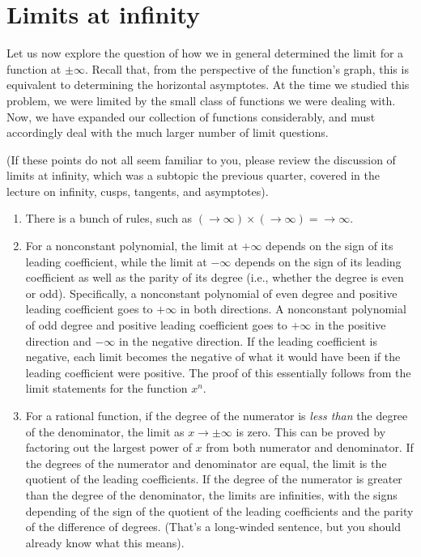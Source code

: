\documentclass[10pt]{amsart}
\begin{document}
\section{Limits at infinity}

Let us now explore the question of how we in general determined the
limit for a function at $\pm \infty$. Recall that, from the
perspective of the function's graph, this is equivalent to determining
the horizontal asymptotes. At the time we studied this problem, we
were limited by the small class of functions we were dealing
with. Now, we have expanded our collection of functions considerably,
and must accordingly deal with the much larger number of limit
questions.

(If these points do not all seem familiar to you, please review the
discussion of limits at infinity, which was a subtopic the previous
quarter, covered in the lecture on infinity, cusps, tangents, and
asymptotes).

\begin{enumerate}
\item There is a bunch of rules, such as $(\to \infty) \times (\to
  \infty) = \to \infty$.
\item For a nonconstant polynomial, the limit at $+\infty$ depends on
  the sign of its leading coefficient, while the limit at $-\infty$
  depends on the sign of its leading coefficient as well as the parity
  of its degree (i.e., whether the degree is even or
  odd). Specifically, a nonconstant polynomial of even degree and
  positive leading coefficient goes to $+\infty$ in both directions. A
  nonconstant polynomial of odd degree and positive leading
  coefficient goes to $+\infty$ in the positive direction and
  $-\infty$ in the negative direction. If the leading coefficient is
  negative, each limit becomes the negative of what it would have been
  if the leading coefficient were positive. The proof of this
  essentially follows from the limit statements for the function
  $x^n$.
\item For a rational function, if the degree of the numerator is {\em
  less than} the degree of the denominator, the limit as $x \to \pm
  \infty$ is zero. This can be proved by factoring out the largest
  power of $x$ from both numerator and denominator. If the degrees of
  the numerator and denominator are equal, the limit is the quotient
  of the leading coefficients. If the degree of the numerator is
  greater than the degree of the denominator, the limits are
  infinities, with the signs depending of the sign of the quotient of
  the leading coefficients and the parity of the difference of
  degrees. (That's a long-winded sentence, but you should already know
  what this means).
\end{enumerate}
\end{document}
